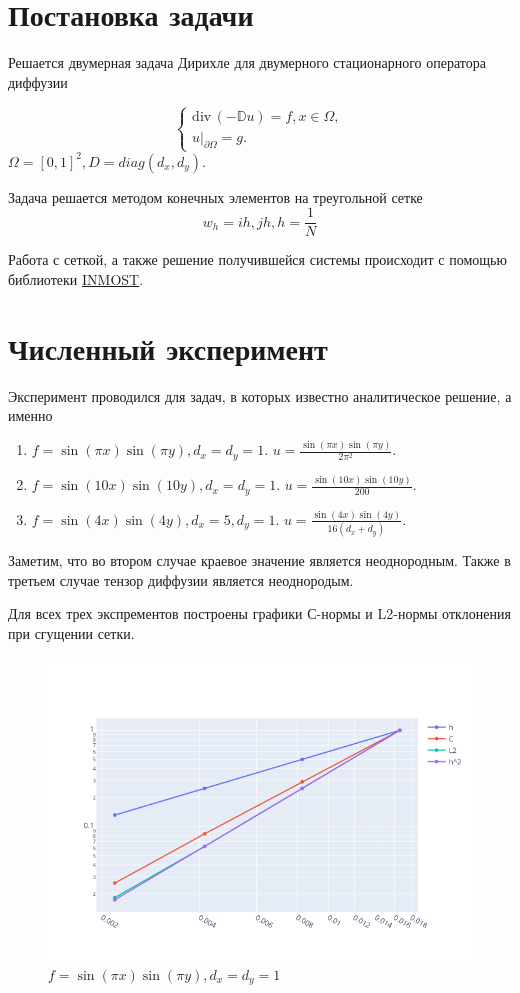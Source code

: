 \documentclass{article}
\newcommand{\divg}{\mathrm{div}\,}
\begin{document}
	
\section{Постановка задачи}
Решается двумерная задача Дирихле для двумерного стационарного оператора диффузии

$$
\begin{cases}
    \divg(-\mathbb{D} u) = f, x \in \Omega, \\
    u|_{\partial \Omega} = g.
\end{cases}
$$
$
    \Omega = [0,1]^2, D = diag(d_x, d_y).
$

Задача решается методом конечных элементов на треугольной сетке
\[
    w_h = {ih, jh}, h = \frac{1}{N}
\]

Работа с сеткой, а также решение получившейся системы происходит с помощью библиотеки \href{https://github.com/INMOST-DEV/INMOST}{INMOST}.


\section{Численный эксперимент}

Эксперимент проводился для задач, в которых известно аналитическое решение, а именно
\begin{enumerate}
	\item $f = \sin(\pi x) \sin(\pi y), d_x = d_y = 1$. $u = \frac{\sin(\pi x) \sin(\pi y)}{2 \pi^2}$.
	\item $f = \sin(10 x) \sin(10 y), d_x = d_y = 1$. $u = \frac{\sin(10 x) \sin(10 y)}{200}$.
	\item $f = \sin(4 x) \sin(4 y), d_x = 5, d_y = 1$. $u = \frac{\sin(4 x) \sin(4 y)}{16(d_x + d_y)}$.
\end{enumerate}

Заметим, что во втором случае краевое значение является неоднородным. Также в третьем случае тензор диффузии является неоднородым.

Для всех трех экспрементов построены графики С-нормы и L2-нормы отклонения при сгущении сетки.

\begin{figure}[h!]
	\centering
	\includegraphics[width=.9\textwidth]{img/res1.png}
	\caption{$f = \sin(\pi x) \sin(\pi y), d_x = d_y = 1$}
\end{figure}
\end{document}
